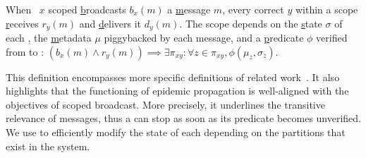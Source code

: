 
\begin{definition}
  When \Process~$x$ scoped \underline{b}roadcasts $b_x(m)$ a
  \underline{m}essage $m$, every correct \process $y$ within a scope
  \underline{r}eceives $r_y(m)$ and \underline{d}elivers it
  $d_y(m)$. The scope depends on the \underline{s}tate $\sigma$ of
  each \process, the \underline{m}etadata $\mu$ piggybacked by each
  message, and a \underline{p}redicate $\phi$ verified from \process
  to \process:
  $(b_x(m) \wedge r_y(m)) \implies \exists \pi_{xy}: \forall z \in
  \pi_{xy}, \phi(\mu_z, \sigma_z)$.
\end{definition}

This definition encompasses more specific definitions of related
work~\cite{hsiao2005scoped, lue2006scoped, wang2015prodiluvian}.  It
also highlights that the functioning of epidemic propagation is
well-aligned with the objectives of scoped broadcast. More precisely,
it underlines the transitive relevance of messages, thus a \process
can stop  as soon as its predicate becomes
unverified.
%
We use \NAMEB to efficiently modify the state of each \process
depending on the partitions that exist in the system.

